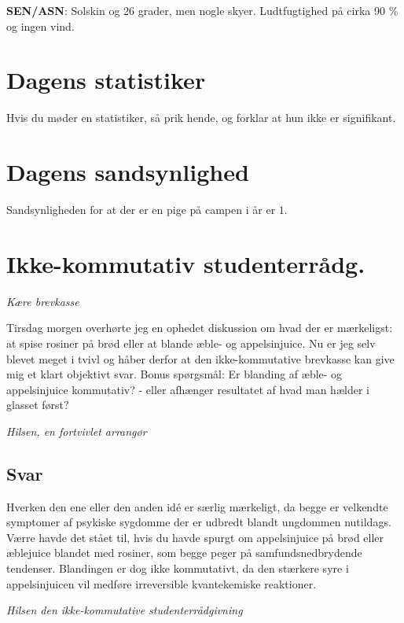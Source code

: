 \begin{minipage}[b]{0.95\linewidth}
\begin{minipage}[t]{0.47\textwidth}
\textbf{SEN/ASN}: Solskin og 26 grader, men nogle skyer. Ludtfugtighed på cirka 90 \% og ingen vind.

\vspace{-2mm}
\section*{Dagens statistiker}
Hvis du møder en statistiker, så prik hende, og forklar at hun ikke er signifikant.

\vspace{-4mm}
\section*{Dagens sandsynlighed}
Sandsynligheden for at der er en pige på campen i år er $1$.

\vspace{-4mm}
\section*{Ikke-kommutativ studenterrådg.}
\emph{Kære brevkasse}

Tirsdag morgen overhørte jeg en ophedet diskussion om hvad der er mærkeligst: at spise rosiner på brød eller at blande æble- og appelsinjuice. Nu er jeg selv blevet meget i tvivl og håber derfor at den ikke-kommutative brevkasse kan give mig et klart objektivt svar. Bonus spørgsmål: Er blanding af æble- og appelsinjuice kommutativ? - eller afhænger resultatet af hvad man hælder i glasset først?
 
\emph{Hilsen, en fortvivlet arrangør}

\vspace{-1mm}
\subsection*{Svar}
Hverken den ene eller den anden idé er særlig mærkeligt, da begge er velkendte symptomer af psykiske sygdomme der er udbredt blandt ungdommen nutildags. Værre havde det stået til, hvis du havde spurgt om appelsinjuice på brød eller æblejuice blandet med rosiner, som begge peger på samfundsnedbrydende tendenser. Blandingen er dog ikke kommutativt, da den stærkere syre i appelsinjuicen vil medføre irreversible kvantekemiske reaktioner.

{\flushright\emph{Hilsen den ikke-kommutative studenterrådgivning}}


\end{minipage}
\end{minipage}
